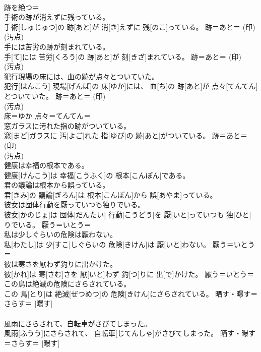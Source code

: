 \documentclass[8pt]{extreport}
\begin{document}
\begin{CJK}{UTF8}{min}
{\\	跡を絶つ＝ 
\\	手術の跡が消えずに残っている。	
\\	手術[しゅじゅつ]の 跡[あと]が 消[き]えずに 残[のこ]っている。	跡＝あと＝ (印) 
\\	(汚点) 
\\	手には苦労の跡が刻まれている。	
\\	手[て]には 苦労[くろう]の 跡[あと]が 刻[きざ]まれている。	跡＝あと＝ (印) 
\\	(汚点) 
\\	犯行現場の床には、血の跡が点々とついていた。	
\\	犯行[はんこう] 現場[げんば]の 床[ゆか]には、 血[ち]の 跡[あと]が 点々[てんてん]とついていた。	跡＝あと＝ (印) 
\\	(汚点) 
\\	床＝ゆか 点々＝てんてん＝ 
\\	窓ガラスに汚れた指の跡がついている。	
\\	窓[まど]ガラスに 汚[よご]れた 指[ゆび]の 跡[あと]がついている。	跡＝あと＝ (印) 
\\	(汚点) 
\\	健康は幸福の根本である。	
\\	健康[けんこう]は 幸福[こうふく]の 根本[こんぽん]である。	
\\	君の議論は根本から誤っている。	
\\	君[きみ]の 議論[ぎろん]は 根本[こんぽん]から 誤[あやま]っている。	
\\	彼女は団体行動を厭っていつも独りでいる。	
\\	彼女[かのじょ]は 団体[だんたい] 行動[こうどう]を 厭[いと]っていつも 独[ひと]りでいる。	厭う＝いとう＝ 
\\	私は少しぐらいの危険は厭わない。	
\\	私[わたし]は 少[すこ]しぐらいの 危険[きけん]は 厭[いと]わない。	厭う＝いとう＝ 
\\	彼は寒さを厭わず釣りに出かけた。	
\\	彼[かれ]は 寒[さむ]さを 厭[いと]わず 釣[つ]りに 出[で]かけた。	厭う＝いとう＝ 
\\	この鳥は絶滅の危険にさらされている。	
\\	この 鳥[とり]は 絶滅[ぜつめつ]の 危険[きけん]にさらされている。	晒す・曝す＝さらす＝ [曝す]
\\	[晒す] 
\\	風雨にさらされて、自転車がさびてしまった。	
\\	風雨[ふうう]にさらされて、 自転車[じてんしゃ]がさびてしまった。	晒す・曝す＝さらす＝ [曝す]
}
\end{CJK}
\end{document}
